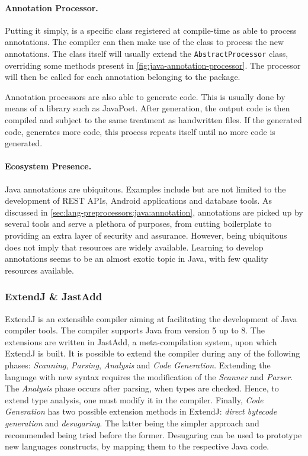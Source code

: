 \paragraph{Annotation Processor.}
Putting it simply, is a specific class registered at compile-time as able to process annotations.
The compiler can then make use of the class to process the new annotations.
The class itself will usually extend the \texttt{AbstractProcessor} class,
overriding some methods present in \autoref{fig:java-annotation-processor}.
The processor will then be called for each annotation belonging to the package.

Annotation processors are also able to generate code.
This is usually done by means of a library such as JavaPoet.
After generation, the output code is then compiled and subject to the same treatment as handwritten files.
If the generated code, generates more code, this process repeats itself until no more code is generated.

\paragraph{Ecosystem Presence.}
Java annotations are ubiquitous.
Examples include but are not limited to the development of REST \gls{API}s,
Android applications and database tools.
As discussed in \autoref{sec:lang-preprocessors:java:annotation},
annotations are picked up by several tools and serve a plethora of purposes,
from cutting boilerplate to providing an extra layer of security and assurance.
However, being ubiquitous does not imply that resources are widely available.
Learning to develop annotations seems to be an almost exotic topic in Java,
with few quality resources available.

\subsubsection*{ExtendJ \& JastAdd}\label{sec:lang-preprocessors:java:extendj}

ExtendJ is an extensible compiler aiming at facilitating the development of Java compiler tools.
The compiler supports Java from version 5 up to 8.
The extensions are written in JastAdd, a meta-compilation system, upon which ExtendJ is built.
It is possible to extend the compiler during any of the following phases: \emph{Scanning}, \emph{Parsing}, \emph{Analysis} and \emph{Code Generation}.
Extending the language with new syntax requires the modification of the \emph{Scanner} and \emph{Parser}.
The \emph{Analysis} phase occurs after parsing, when types are checked.
Hence, to extend type analysis, one must modify it in the compiler.
Finally, \emph{Code Generation} has two possible extension methods in ExtendJ:
\emph{direct bytecode generation} and \emph{desugaring}.
The latter being the simpler approach and recommended being tried before the former.
Desugaring can be used to prototype new languages constructs, by mapping them to the respective Java code.

